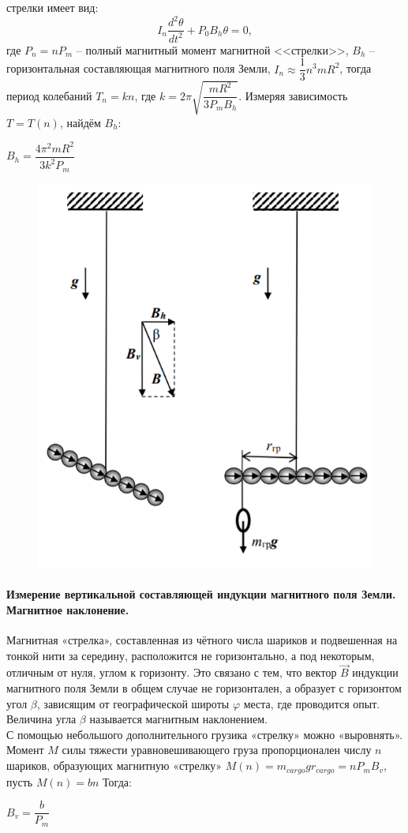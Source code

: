 \documentclass[a4paper,12pt]{article}
\begin{document}
стрелки имеет вид:
$$
I_n \dfrac{d^2 \theta}{dt^2} + P_0 B_h \theta = 0,
$$ 
где $P_n = nP_m$ -- полный магнитный момент магнитной <<стрелки>>, $B_h$ -- горизонтальная составляющая магнитного поля Земли, $I_n \approx \dfrac{1}{3}n^3 m R^2$, тогда период колебаний $T_n = kn$, где $k = 2\pi \sqrt{\dfrac{mR^2}{3P_m B_h}}$. Измеряя зависимость $T=T(n)$, найдём $B_h$:
\begin{center}
$B_h = \dfrac{4\pi^2 m R^2}{3k^2P_m}$
\end{center}
\begin{figure}
\includegraphics[scale=0.5]{2.png}
\end{figure} 
\paragraph*{Измерение вертикальной составляющей индукции магнитного поля Земли. Магнитное наклонение.}
Магнитная «стрелка», составленная из чётного числа шариков и подвешенная на тонкой нити за середину, расположится не горизонтально, а под некоторым, отличным от нуля, углом к горизонту. Это связано с тем, что вектор $\vec{B}$ индукции магнитного поля Земли в общем случае не горизонтален, а образует с горизонтом угол $\beta$, зависящим от географической широты $\varphi$
места, где проводится опыт. Величина угла $\beta$
называется магнитным наклонением.\\
С помощью небольшого дополнительного грузика «стрелку» можно «выровнять». Момент $M$ силы тяжести уравновешивающего груза пропорционален числу $n$ шариков, образующих магнитную «стрелку» $M(n) = m_{cargo}gr_{cargo} = n P_m B_v$, пусть $M(n) = bn$
Тогда:
\begin{center}
$B_v = \dfrac{b}{P_m}$
\end{center}
\end{document}
